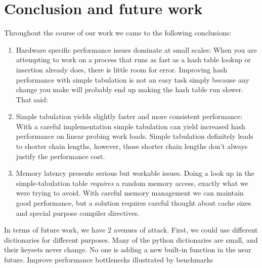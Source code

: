 \documentclass[12pt]{article}
\begin{document}
\section{Conclusion and future work}
Throughout the course of our work we came to the following conclusions:
\begin{enumerate}
\item Hardware specific performance issues dominate at small scales: When you are attempting to work on a process that runs as fast as a hash table lookup or insertion already does, there is little room for error.  Improving hash performance with simple tabulation is not an easy task simply because any change you make will probably end up making the hash table run slower.  That said:

\item Simple tabulation yields slightly faster and more consistent performance: With a careful implementation simple tabulation can yield increased hash performance on linear probing work loads. Simple tabulation definitely leads to shorter chain lengths, however, those shorter chain lengths don’t always justify the performance cost.

\item Memory latency presents serious but workable issues.  Doing a look up in the simple-tabulation table \emph{requires} a random memory access, exactly what we were trying to avoid. With careful memory management we can maintain good performance, but a solution requires careful thought about cache sizes and special purpose compiler directives.

\end{enumerate}

In terms of future work, we have 2 avenues of attack. First, we could use different dictionaries for different purposes. Many of the python dictionaries are small, and their keysets never change. No one is adding a new built-in function in the near future. 
Improve performance bottlenecks illustrated by benchmarks
\end{document}
